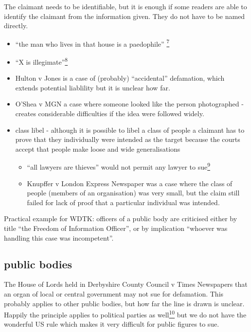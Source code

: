 \documentclass[]{article}
\begin{document}
The claimant needs to be identifiable, but it is enough if some readers
are able to identify the claimant from the information given. They do
not have to be named directly.

\begin{itemize}
\item
  ``{the man who lives in that house is a paedophile''
  \hyperref[sdfootnote7sym]{\textsuperscript{7}}}
\item
  ``{X is illegimate''\hyperref[sdfootnote8sym]{\textsuperscript{8}}}
\item
  Hulton v Jones is a case of (probably) ``accidental'' defamation,
  which extends potential liablility but it is unclear how far.
\item
  O'Shea v MGN a case where someone looked like the person photographed
  - creates considerable difficulties if the idea were followed widely.
\item
  class libel - although it is possible to libel a class of people a
  claimant has to prove that they individually were intended as the
  target because the courts accept that people make loose and wide
  generalisations

  \begin{itemize}
  \item
    ``{all lawyers are thieves'' would not permit any lawyer to
    sue\hyperref[sdfootnote9sym]{\textsuperscript{9}}}
  \item
    Knupffer v London Express Newspaper was a case where the class of
    people (members of an organisation) was very small, but the claim
    still failed for lack of proof that a particular individual was
    intended.
  \end{itemize}
\end{itemize}

Practical example for WDTK: officers of a public body are criticised
either by title ``the Freedom of Information Officer'', or by
implication ``whoever was handling this case was incompetent''.

\subsection{public bodies}

{The House of Lords held in Derbyshire County Council v Times Newspapers
that an organ of local or central government may not sue for defamation.
This probably applies to other public bodies, but how far the line is
drawn is unclear. Happily the principle applies to political parties as
well\hyperref[sdfootnote10sym]{\textsuperscript{10}} but we do not have
the wonderful US rule which makes it very difficult for public figures
to sue.}
\end{document}
